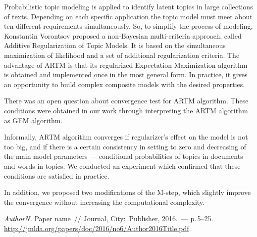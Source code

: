 \documentclass[twoside]{article}
\begin{document}
Probabilistic topic modeling is applied to identify latent topics in large collections of texts. Depending on each specific application the topic model must meet about ten different requirements simultaneously. So, to simplify the process of modeling, Konstantin Vorontsov proposed a non-Bayesian multi-criteria approach, called Additive Regularization of Topic Models. It is based on the simultaneous maximization  of likelihood and a set of additional regularization criteria. The advantage of ARTM  is that its regularized Expectation Maximization algorithm is obtained and implemented once in the most general form. In practice, it gives an opportunity to build complex composite models with the desired properties.

There was an open question about convergence test for ARTM algorithm. These conditions were obtained in our work through interpreting the ARTM algorithm as GEM algorithm. 

Informally, ARTM algorithm converges if regularizer's effect on the model is not too big, and if there is a certain consistency in setting to zero and decreasing  of the main model parameters --- conditional probabilities of topics in documents and words in topics.  We conducted an experiment which confirmed that these conditions are satisfied in practice.

In addition, we proposed two modifications of the M-step, which slightly improve the convergence without increasing the computational complexity.
\begin{thebibliography}{1}
    \emph{Author\;N.}
    Paper name~//
    Journal,
    City:~Publisher, 2016.~--- p.\,5--25.
    \url{http://jmlda.org/papers/doc/2016/no6/Author2016Title.pdf}.
\end{thebibliography}
\end{document}

